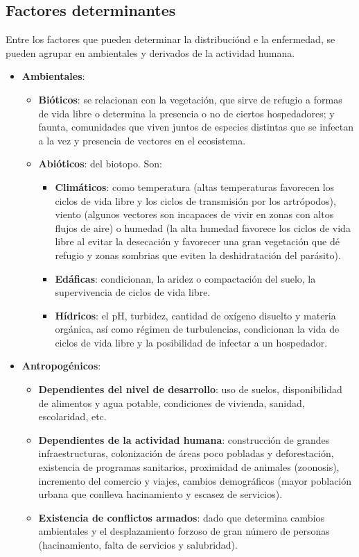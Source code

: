 \subsection{Factores determinantes}
Entre los factores que pueden determinar la distribuciónd e la enfermedad, se pueden agrupar en ambientales y derivados de la actividad humana.
\begin{itemize}[itemsep=0pt,parsep=0pt,topsep=0pt,partopsep=0pt]
	\item \textbf{Ambientales}:
	\begin{itemize}[itemsep=0pt,parsep=0pt,topsep=0pt,partopsep=0pt]
		\item \textbf{Bióticos}: se relacionan con la vegetación, que sirve de refugio a formas de vida libre o determina la presencia o no de ciertos hospedadores; y faunta, comunidades que viven juntos de especies distintas que se infectan a la vez y presencia de vectores en el ecosistema.
		\item\textbf{Abióticos}: del biotopo. Son:
		\begin{itemize}[itemsep=0pt,parsep=0pt,topsep=0pt,partopsep=0pt]
			\item \textbf{Climáticos}: como temperatura (altas temperaturas favorecen los ciclos de vida libre y los ciclos de transmisión por los artrópodos), viento (algunos vectores son incapaces de vivir en zonas con altos flujos de aire) o humedad (la alta humedad favorece los ciclos de vida libre al evitar la desecación y favorecer una gran vegetación que dé refugio y zonas sombrias que eviten la deshidratación del parásito).
			\item\textbf{Edáficas}: condicionan, la aridez o compactación del suelo, la supervivencia de ciclos de vida libre.
			\item\textbf{Hídricos}: el pH, turbidez, cantidad de oxígeno disuelto y materia orgánica, así como régimen de turbulencias, condicionan la vida de ciclos de vida libre y la posibilidad de infectar a un hospedador.
		\end{itemize}
	\end{itemize}
	\item\textbf{Antropogénicos}:
	\begin{itemize}[itemsep=0pt,parsep=0pt,topsep=0pt,partopsep=0pt]
		\item \textbf{Dependientes del nivel de desarrollo}: uso de suelos, disponibilidad de alimentos y agua potable, condiciones de vivienda, sanidad, escolaridad, etc.
		\item\textbf{Dependientes de la actividad humana}: construcción de grandes infraestructuras, colonización de áreas poco pobladas y deforestación, existencia de programas sanitarios, proximidad de animales (zoonosis), incremento del comercio y viajes, cambios demográficos (mayor población urbana que conlleva hacinamiento y escasez de servicios).
		\item\textbf{Existencia de conflictos armados}: dado que determina cambios ambientales y el desplazamiento forzoso de gran número de personas (hacinamiento, falta de servicios y salubridad).
	\end{itemize}
\end{itemize}

